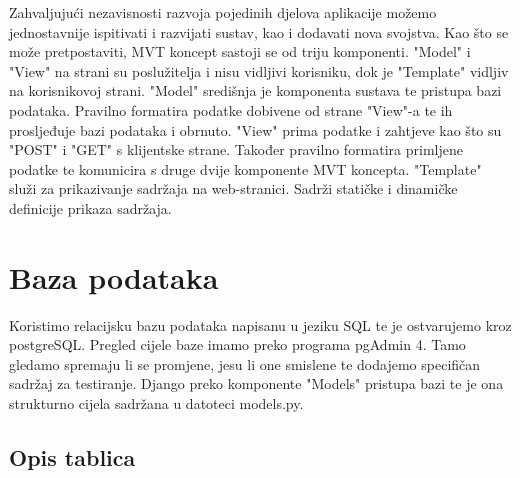 		Zahvaljujući nezavisnosti razvoja pojedinih djelova aplikacije možemo jednostavnije ispitivati i razvijati sustav, kao i dodavati nova svojstva. Kao što se može pretpostaviti, MVT koncept sastoji se od triju komponenti. "Model" i "View" na strani su poslužitelja i nisu vidljivi korisniku, dok je "Template" vidljiv na korisnikovoj strani. "Model" središnja je komponenta sustava te pristupa bazi podataka. Pravilno formatira podatke dobivene od strane "View"-a te ih prosljeđuje bazi podataka i obrnuto. "View" prima podatke i zahtjeve kao što su "POST" i "GET" s klijentske strane. Također pravilno formatira primljene podatke te komunicira s druge dvije komponente MVT koncepta. "Template" služi za prikazivanje sadržaja na web-stranici. Sadrži statičke i dinamičke definicije prikaza sadržaja.
		
	
		
		

				
		\section{Baza podataka}
			
		Koristimo relacijsku bazu podataka napisanu u jeziku SQL te je ostvarujemo kroz postgreSQL. Pregled cijele baze imamo preko programa pgAdmin 4. Tamo gledamo spremaju li se promjene, jesu li one smislene te dodajemo specifičan sadržaj za testiranje. Django preko komponente "Models" pristupa bazi te je ona strukturno cijela sadržana u datoteci models.py.
		
			\subsection{Opis tablica}
			
